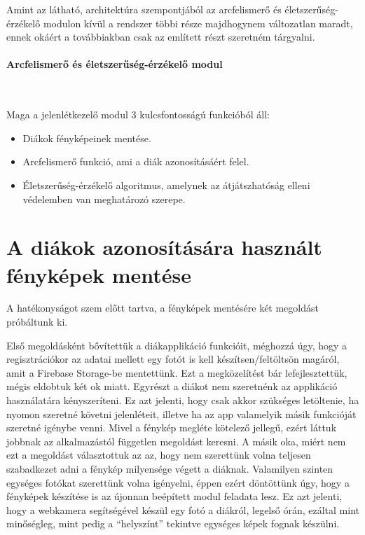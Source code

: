 Amint az látható, architektúra szempontjából az arcfelismerő és életszerűség-érzékelő modulon kívül a rendszer többi része majdhogynem változatlan maradt, ennek okáért a továbbiakban csak az említett részt szeretném tárgyalni.


\paragraph{Arcfelismerő és életszerűség-érzékelő modul}\

Maga a jelenlétkezelő modul 3 kulcsfontosságú funkcióból áll:

\begin{itemize}
    \item Diákok fényképeinek mentése.
    \item Arcfelismerő funkció, ami a diák azonosításáért felel.
    \item Életszerűség-érzékelő algoritmus, amelynek az átjátszhatóság elleni védelemben van meghatározó szerepe.
\end{itemize}

\section{A diákok azonosítására használt fényképek mentése}

A hatékonyságot szem előtt tartva, a fényképek mentésére két megoldást próbáltunk ki.

Első megoldásként bővítettük a diákapplikáció funkcióit, méghozzá úgy, hogy a regisztrációkor az adatai mellett egy fotót is kell készítsen/feltöltsön magáról, amit a Firebase Storage-be mentettünk. Ezt a megközelítést bár lefejlesztettük, mégis eldobtuk két ok miatt. Egyrészt a diákot nem szeretnénk az applikáció használatára kényszeríteni. Ez azt jelenti, hogy csak akkor szükséges letöltenie, ha nyomon szeretné követni jelenléteit, illetve ha az app valamelyik másik funkcióját szeretné igénybe venni. Mivel a fénykép megléte kötelező jellegű, ezért láttuk jobbnak az alkalmazástól független megoldást keresni. A másik oka, miért nem ezt a megoldást választottuk az az, hogy nem szerettünk volna teljesen szabadkezet adni a fénykép milyensége végett a diáknak. Valamilyen szinten egységes fotókat szerettünk volna igényelni, éppen ezért döntöttünk úgy, hogy a fényképek készítése is az újonnan beépített modul feladata lesz. Ez azt jelenti, hogy a webkamera segítségével készül egy fotó a diákról, legelső órán, ezáltal mint minőségleg, mint pedig a \enquote{helyszínt} tekintve egységes képek fognak készülni.

